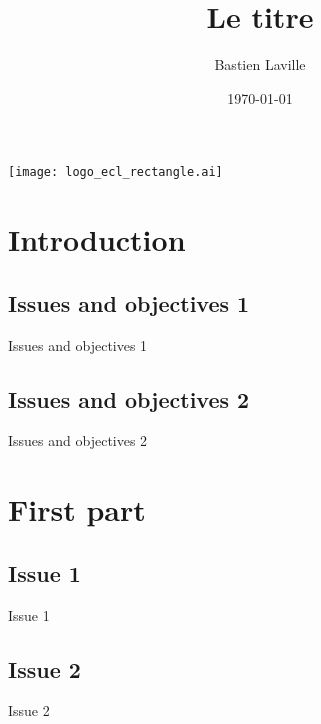 \documentclass{beamer}
\title{Le titre}
\author{Bastien Laville}
\date{\today}
\institute[]{Centrale Lyon le 100}
\begin{document}
\begin{frame}
	\titlepage
	\begin{center}
	\texttt{[image: logo\_ecl\_rectangle.ai]}

	\end{center}
\end{frame}

\section{Introduction}
\subsection{Issues and objectives 1}
\begin{frame}{Issues and objectives 1}

\end{frame}
\subsection{Issues and objectives 2}
\begin{frame}{Issues and objectives 2}

\end{frame}


\section{First part}
\subsection{Issue 1}
\begin{frame}{Issue 1}

\end{frame}
\subsection{Issue 2}
\begin{frame}{Issue 2}

\end{frame}
\end{document}
